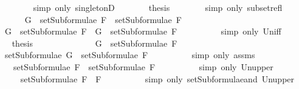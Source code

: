 \begin{isabellebody}
\ \ \ \ \ \ \isamarkupfalse%
\ {\isacharparenleft}simp\ only{\isacharcolon}\ singletonD{\isacharparenright}\isanewline
\ \ \ \ \isamarkupfalse%
\ \isamarkupfalse%
\ {\isacharquery}thesis\isanewline
\ \ \ \ \ \ \isamarkupfalse%
\ {\isacharparenleft}simp\ only{\isacharcolon}\ subset{\isacharunderscore}refl{\isacharparenright}\isanewline
\ \ \isamarkupfalse%
\isanewline
\ \ \ \ \isamarkupfalse%
\ {\isachardoublequoteopen}G\ {\isasymin}\ setSubformulae\ F{}\ {\isasymunion}\ setSubformulae\ F{}{\isachardoublequoteclose}\isanewline
\ \ \ \ \isamarkupfalse%
\ \isamarkupfalse%
\ {\isachardoublequoteopen}G\ {\isasymin}\ setSubformulae\ F{}\ {\isasymor}\ G\ {\isasymin}\ setSubformulae\ F{}{\isachardoublequoteclose}\ \ \isanewline
\ \ \ \ \ \ \isamarkupfalse%
\ {\isacharparenleft}simp\ only{\isacharcolon}\ Un{\isacharunderscore}iff{\isacharparenright}\isanewline
\ \ \ \ \isamarkupfalse%
\ \isamarkupfalse%
\ {\isacharquery}thesis\isanewline
\ \ \ \ \isamarkupfalse%
\ \isanewline
\ \ \ \ \ \ \isamarkupfalse%
\ {\isachardoublequoteopen}G\ {\isasymin}\ setSubformulae\ F{}{\isachardoublequoteclose}\isanewline
\ \ \ \ \ \ \isamarkupfalse%
\ \isamarkupfalse%
\ {\isachardoublequoteopen}setSubformulae\ G\ {\isasymsubseteq}\ setSubformulae\ F{}{\isachardoublequoteclose}\isanewline
\ \ \ \ \ \ \ \ \isamarkupfalse%
\ {\isacharparenleft}simp\ only{\isacharcolon}\ assms{\isacharparenleft}{}{\isacharparenright}{\isacharparenright}\isanewline
\ \ \ \ \ \ \isamarkupfalse%
\ \isamarkupfalse%
\ {\isachardoublequoteopen}{\isasymdots}\ {\isasymsubseteq}\ setSubformulae\ F{}\ {\isasymunion}\ setSubformulae\ F{}{\isachardoublequoteclose}\isanewline
\ \ \ \ \ \ \ \ \isamarkupfalse%
\ {\isacharparenleft}simp\ only{\isacharcolon}\ Un{\isacharunderscore}upper{}{\isacharparenright}\isanewline
\ \ \ \ \ \ \isamarkupfalse%
\ \isamarkupfalse%
\ {\isachardoublequoteopen}{\isasymdots}\ {\isasymsubseteq}\ setSubformulae\ {\isacharparenleft}F{}\ \isactrlbold {\isasymand}\ F{}{\isacharparenright}{\isachardoublequoteclose}\isanewline
\ \ \ \ \ \ \ \ \isamarkupfalse%
\ {\isacharparenleft}simp\ only{\isacharcolon}\ setSubformulae{\isacharunderscore}and\ Un{\isacharunderscore}upper{}{\isacharparenright}\isanewline

\end{isabellebody}
